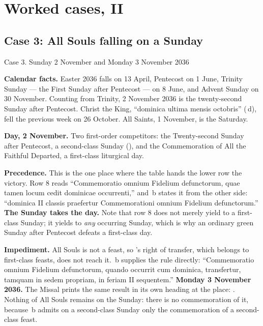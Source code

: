 \section{Worked cases, II}

\subsection{Case 3: All Souls falling on a Sunday}

\begin{casebox}{Case 3. Sunday 2 November and Monday 3 November 2036}

\textbf{Calendar facts.} Easter 2036 falls on 13 April, Pentecost on 1 June,
Trinity Sunday --- the First Sunday after Pentecost --- on 8 June, and Advent
Sunday on 30 November. Counting from Trinity, 2 November 2036 is the
twenty-second Sunday after Pentecost. Christ the King, ``dominica ultima
mensis octobris'' (\,d), fell the previous week on 26 October. All
Saints, 1 November, is the Saturday.

\begin{steps}
\item \textbf{Day, 2 November.} Two first-order competitors: the Twenty-second
Sunday after Pentecost, a second-class Sunday (), and the Commemoration
of All the Faithful Departed, a first-class liturgical day.

\item \textbf{Precedence.} This is the one place where the table hands the
lower row the victory. Row 8 reads ``Commemoratio omnium Fidelium
defunctorum, quae tamen locum cedit dominicae occurrenti,'' and \,b
states it from the other side: ``dominica II classis praefertur Commemorationi
omnium Fidelium defunctorum.'' \textbf{The Sunday takes the day.} Note that
row 8 does not merely yield to a first-class Sunday; it yields to \emph{any}
occurring Sunday, which is why an ordinary green Sunday after Pentecost
defeats a first-class day.

\item \textbf{Impediment.} All Souls is not a feast, so 's right of
transfer, which belongs to first-class feasts, does not reach it. \,b
supplies the rule directly: ``Commemoratio omnium Fidelium defunctorum, quando
occurrit cum dominica, transfertur, tamquam in sedem propriam, in feriam II
sequentem.'' \textbf{Monday 3 November 2036.} The Missal prints the same
result in its own heading at the place: . Nothing of All Souls remains on the
Sunday: there is no commemoration of it, because \,b admits on a
second-class Sunday only the commemoration of a second-class feast.


\end{steps}
\end{casebox}
